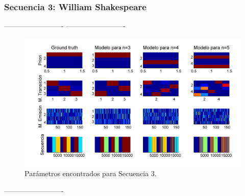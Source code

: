 \newpage
\subsubsection{Secuencia 3: William Shakespeare}

-------------------------
-------------------------

\begin{figure}[H]
  \centerline
  {\includegraphics[width=1.3\linewidth]{gfx/chap6/lear31}} \quad
  \caption{Parámetros encontrados para Secuencia 3.}
  \label{fig:prb1_par}
\end{figure}

-------------------------

